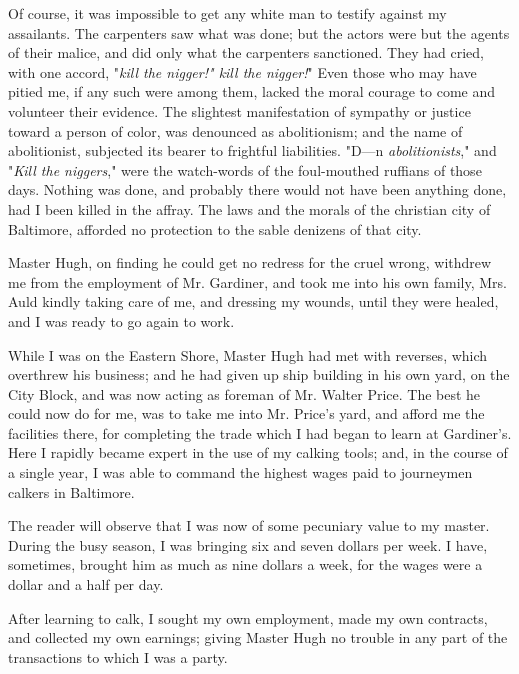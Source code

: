 Of course, it was impossible to get any white man to testify against my
assailants. The carpenters saw what was done; but the actors were but
the agents of their malice, and did only what the carpenters sanctioned.
They had cried, with one accord, "\emph{kill the nigger!" kill the
nigger!}" Even those who may have pitied me, if any such were among
them, lacked the moral courage to come and volunteer their evidence. The
slightest manifestation of sympathy or justice toward a person of color,
was denounced as abolitionism; and the name of abolitionist, subjected
its bearer to frightful liabilities. "D---n \emph{abolitionists}," and
"\emph{Kill the niggers}," were the watch-words of the foul-mouthed
ruffians of those days. Nothing was done, and probably there would not
have been anything done, had I been killed in the affray. The laws and
the morals of the christian city of
{\protect\hypertarget{318}{}{}}Baltimore, afforded no protection to the
sable denizens of that city.

Master Hugh, on finding he could get no redress for the cruel wrong,
withdrew me from the employment of Mr. Gardiner, and took me into his
own family, Mrs. Auld kindly taking care of me, and dressing my wounds,
until they were healed, and I was ready to go again to work.

While I was on the Eastern Shore, Master Hugh had met with reverses,
which overthrew his business; and he had given up ship building in his
own yard, on the City Block, and was now acting as foreman of Mr. Walter
Price. The best he could now do for me, was to take me into Mr. Price's
yard, and afford me the facilities there, for completing the trade which
I had began to learn at Gardiner's. Here I rapidly became expert in the
use of my calking tools; and, in the course of a single year, I was able
to command the highest wages paid to journeymen calkers in Baltimore.

The reader will observe that I was now of some pecuniary value to my
master. During the busy season, I was bringing six and seven dollars per
week. I have, sometimes, brought him as much as nine dollars a week, for
the wages were a dollar and a half per day.

After learning to calk, I sought my own employment, made my own
contracts, and collected my own earnings; giving Master Hugh no trouble
in any part of the transactions to which I was a party.

